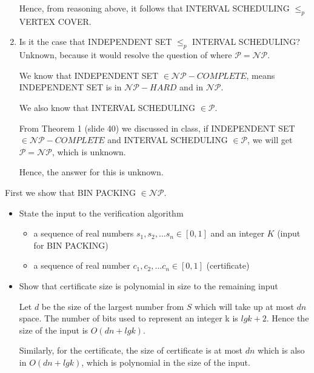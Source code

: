 \documentclass{cpsc413Solutions}
\begin{document}
\begin{problemlist}
\begin{problem}
\begin{answer}
\begin{enumerate}
    Hence, from reasoning above, it follows that INTERVAL SCHEDULING $\leq_p$ VERTEX COVER.\\
    
    
    \item Is it the case that INDEPENDENT SET $\leq_p$ INTERVAL SCHEDULING?\\
    
    Unknown, because it would resolve the question of where $\mathcal{P=NP}$.
    
    We know that INDEPENDENT SET $\in \mathcal{NP}-COMPLETE$, means INDEPENDENT SET is in $\mathcal{NP}-HARD$ and in $\mathcal{NP}$.
    
    We also know that INTERVAL SCHEDULING $\in \mathcal{P}$.
    
    From Theorem 1 (slide 40) we discussed in class, if INDEPENDENT SET $\in \mathcal{NP}-COMPLETE$ and INTERVAL SCHEDULING $\in \mathcal{P}$, we will get $\mathcal{P=NP}$, which is unknown.

    Hence, the answer for this is unknown.

\end{enumerate}
\end{answer}

\newpage
\pbitem
\begin{answer}

First we show that BIN PACKING $\in \mathcal{NP}$. 

\begin{itemize}
    \item State the input to the verification algorithm
    \begin{itemize}
        \item a sequence of real numbers $s_1, s_2,\dots s_n \in [0,1]$ and  an integer $K$ (input for BIN PACKING)
        \item a sequence of real number $c_1, c_2, \dots c_n \in [0,1]$ (certificate)
    \end{itemize}
    
    \item Show that certificate size is polynomial in size to the remaining input
    
    Let $d$ be the size of the largest number from $S$ which will take up at most $dn$ space. The number of bits used to represent an integer k is $lgk +2$. Hence the size of the input is $O(dn+lgk)$.
    
    Similarly, for the certificate, the size of certificate is at most $dn$ which is also in $O(dn + lgk)$, which is polynomial in the size of the input.
    

\end{itemize}
\end{answer}
\end{problem}
\end{problemlist}
\end{document}
